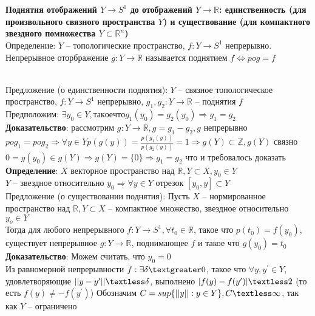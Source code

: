 	\section{}
	\textbf{Поднятия отображений $Y \rightarrow S^1$ до отображений $Y \rightarrow \mathbb{R}$: единственность (для произвольного связного пространства $Y$) и существование (для компактного звездного помножества $Y\subset \mathbb{R}^n$)}\\
	
	Определение: $Y$ -- топологические пространство, $f: Y \rightarrow S^1$ непрерывно. Непрерывное оторбражение $g: Y \rightarrow \mathbb{R}$ называется поднятием $f \Leftrightarrow pog = f$\\
	\begin{figure}[h]
	\end{figure}\\
	Предложение (о единственности поднятия): $Y$ -- связное топологическое пространство, $f: Y \rightarrow S^1$ непрерывно, $g_1, g_2: Y \rightarrow \mathbb{R}$ -- поднятия $f$\\
	Предположим: $\exists y_0 \in Y, такое что g_1(y_0) = g_2(y_0) \Rightarrow g_1 = g_2$\\
	\textbf{Доказательство}: рассмотрим $g: Y \rightarrow \mathbb{R}, g = g_1 - g_2, g$ непрерывно\\
	$pog_1 = pog_2 \Rightarrow \forall y \in Y p(g(y)) = \frac{p(g_1 (y))}{p(g_2 (y))} = 1 \Rightarrow g(Y) \subset \mathbb{Z}, g(Y)$ связно\\
	$0 = g(y_0) \in g(Y) \Rightarrow g(Y) = \{0\} \Rightarrow g_1 = g_2$ что и требовалось доказать\\
	\textbf{Определение}: $X$ векторное пространство над $\mathbb{R}, Y\subset X, y_0 \in Y$\\
	$Y$ -- звездное относительно $y_0 \Rightarrow \forall y\in Y$ отрезок $[y_0, y] \subset Y$\\
	Предложение (о существовании поднятия): Пусть $X$ -- нормированное пространство над $\mathbb{R}, Y\subset X$ -- компактное множество, звездное относительно $y_o \in Y$\\
	Тогда для любого непрерывного $f: Y\rightarrow S^1, \forall t_0 \in \mathbb{R}$, такое что $p(t_0) = f(y_0)$, существует непрерывное $g: Y\rightarrow \mathbb{R}$, поднимающее $f$ и такое что $g(y_0) = t_0$\\
	\textbf{Доказательство}: Можем считать, что $y_0 = 0$\\
	Из равномерной непрерывности $f: \exists \delta \textgreater 0$, такое что $\forall y, y^{\prime} \in Y$, удовлетворяющие $||y-y^{\prime}|| \textless \delta$, выполнено $|f(y)-f(y^{\prime})| \textless 2$ (то есть $f(y) \neq -f(y^{\prime})$) Обозначим $C = sup \{||y||: y\in Y\}, C \textless \infty$, так как $Y$ -- ограничено\\
